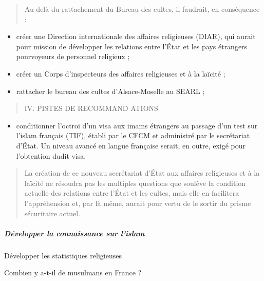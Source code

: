 \begin{quote}
Au-delà du rattachement du Bureau des cultes, il faudrait, en
conséquence :
\end{quote}

\begin{itemize}
\item
  créer une Direction internationale des affaires religieuses (DIAR),
  qui aurait pour mission de développer les relations entre l'État et
  les pays étrangers pourvoyeurs de personnel religieux ;
\item
  créer un Corps d'inspecteurs des affaires religieuses et à la laïcité
  ;
\item
  rattacher le bureau des cultes d'Alsace-Moselle au SEARL ;
\end{itemize}

\begin{quote}
IV. PISTES DE RECOMMAND ATIONS
\end{quote}

\begin{itemize}
\item
  conditionner l'octroi d'un visa aux imams étrangers au passage d'un
  test sur l'islam français (TIF), établi par le CFCM et administré par
  le secrétariat d'État. Un niveau avancé en langue française serait, en
  outre, exigé pour l'obtention dudit visa.
\end{itemize}

\begin{quote}
La création de ce nouveau secrétariat d'État aux affaires religieuses et
à la laïcité ne résoudra pas les multiples questions que soulève la
condition actuelle des relations entre l'État et les cultes, mais elle
en facilitera l'appréhension et, par là même, aurait pour vertu de le
sortir du prisme sécuritaire actuel.
\end{quote}

\hypertarget{duxe9velopper-la-connaissance-sur-lislam}{%
\subparagraph{Développer la connaissance sur
l'islam}\label{duxe9velopper-la-connaissance-sur-lislam}}

Développer les statistiques religieuses

Combien y a-t-il de musulmans en France ?

